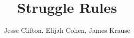 \documentclass{article}
\title{Struggle Rules}
\author{Jesse Clifton, Elijah Cohen, James Krause}
\begin{document}
\maketitle

\newpage




\newpage

\
\

\newpage

\newpage

\
\

\
\

\newpage

\newpage

\newpage

\end{document}
